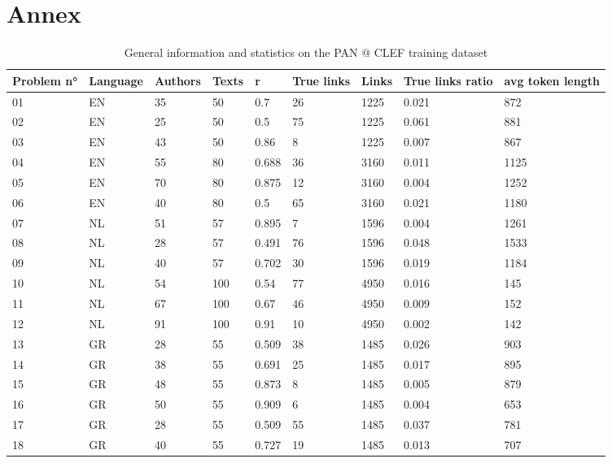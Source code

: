 \section{Annex}

\begin{table*}[h]
  \caption{General information and statistics on the PAN @ CLEF training dataset}
  \label{tab:pan_datasets}
  \begin{tabular}{|l|l|l|l|l|l|l|l|l|}
    \hline
    \textbf{Problem n°} &
    \textbf{Language} &
    \textbf{Authors} &
    \textbf{Texts} &
    \textbf{r} &
    \textbf{True links} &
    \textbf{Links} &
    \textbf{True links ratio} &
    \textbf{avg token length} \\ \hline
      01 & EN & 35 & 50 & 0.7 & 26 & 1225 & 0.021 & 872 \\ \hline
      02 & EN & 25 & 50 & 0.5 & 75 & 1225 & 0.061 & 881 \\ \hline
      03 & EN & 43 & 50 & 0.86 & 8 & 1225 & 0.007 & 867 \\ \hline
      04 & EN & 55 & 80 & 0.688 & 36 & 3160 & 0.011 & 1125 \\ \hline
      05 & EN & 70 & 80 & 0.875 & 12 & 3160 & 0.004 & 1252 \\ \hline
      06 & EN & 40 & 80 & 0.5 & 65 & 3160 & 0.021 & 1180 \\ \hline
      07 & NL & 51 & 57 & 0.895 & 7 & 1596 & 0.004 & 1261 \\ \hline
      08 & NL & 28 & 57 & 0.491 & 76 & 1596 & 0.048 & 1533 \\ \hline
      09 & NL & 40 & 57 & 0.702 & 30 & 1596 & 0.019 & 1184 \\ \hline
      10 & NL & 54 & 100 & 0.54 & 77 & 4950 & 0.016 & 145 \\ \hline
      11 & NL & 67 & 100 & 0.67 & 46 & 4950 & 0.009 & 152 \\ \hline
      12 & NL & 91 & 100 & 0.91 & 10 & 4950 & 0.002 & 142 \\ \hline
      13 & GR & 28 & 55 & 0.509 & 38 & 1485 & 0.026 & 903 \\ \hline
      14 & GR & 38 & 55 & 0.691 & 25 & 1485 & 0.017 & 895 \\ \hline
      15 & GR & 48 & 55 & 0.873 & 8 & 1485 & 0.005 & 879 \\ \hline
      16 & GR & 50 & 55 & 0.909 & 6 & 1485 & 0.004 & 653 \\ \hline
      17 & GR & 28 & 55 & 0.509 & 55 & 1485 & 0.037 & 781 \\ \hline
      18 & GR & 40 & 55 & 0.727 & 19 & 1485 & 0.013 & 707 \\ \hline
  \end{tabular}
\end{table*}
